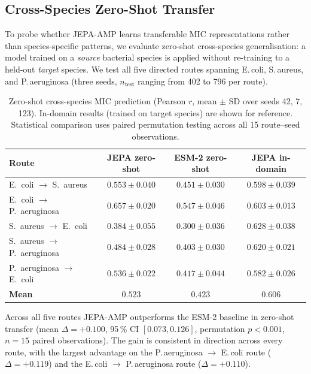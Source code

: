 \subsection{Cross-Species Zero-Shot Transfer}
\label{sec:res_cross_species}

To probe whether JEPA-AMP learns transferable MIC representations rather than
species-specific patterns, we evaluate zero-shot cross-species generalisation:
a model trained on a \emph{source} bacterial species is applied without
re-training to a held-out \emph{target} species.
We test all five directed routes spanning E.\,coli, S.\,aureus, and
P.\,aeruginosa (three seeds, $n_{\text{test}}$ ranging from 402 to 796 per
route).

\begin{table}[h]
\centering
\caption{Zero-shot cross-species MIC prediction (Pearson $r$, mean $\pm$ SD
  over seeds 42, 7, 123).
  In-domain results (trained on target species) are shown for reference.
  Statistical comparison uses paired permutation testing across all 15
  route--seed observations.}
\label{tab:cross_species}
\begin{tabular}{lccc}
\toprule
\textbf{Route} & \textbf{JEPA zero-shot} & \textbf{ESM-2 zero-shot} & \textbf{JEPA in-domain} \\
\midrule
E.~coli $\to$ S.~aureus       & $0.553 \pm 0.040$ & $0.451 \pm 0.030$ & $0.598 \pm 0.039$ \\
E.~coli $\to$ P.~aeruginosa   & $0.657 \pm 0.020$ & $0.547 \pm 0.046$ & $0.603 \pm 0.013$ \\
S.~aureus $\to$ E.~coli       & $0.384 \pm 0.055$ & $0.300 \pm 0.036$ & $0.628 \pm 0.038$ \\
S.~aureus $\to$ P.~aeruginosa & $0.484 \pm 0.028$ & $0.403 \pm 0.030$ & $0.620 \pm 0.021$ \\
P.~aeruginosa $\to$ E.~coli   & $0.536 \pm 0.022$ & $0.417 \pm 0.044$ & $0.582 \pm 0.026$ \\
\midrule
\textbf{Mean}                 & $\mathbf{0.523}$ & $0.423$ & $0.606$ \\
\bottomrule
\end{tabular}
\end{table}

Across all five routes JEPA-AMP outperforms the ESM-2 baseline in zero-shot
transfer (mean $\Delta = +0.100$, 95\,\% CI $[0.073, 0.126]$,
permutation $p < 0.001$, $n = 15$ paired observations).
The gain is consistent in direction across every route, with the largest
advantage on the P.\,aeruginosa $\to$ E.\,coli route
($\Delta = +0.119$) and the E.\,coli $\to$ P.\,aeruginosa route
($\Delta = +0.110$).

